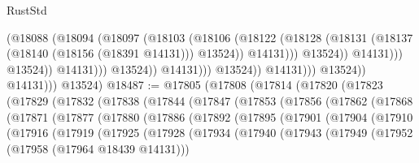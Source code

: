 \begin{lexlean}{RustStd}
\begin{coremodule}
                                                (@18088
                                                  (@18094
                                                    (@18097
                                                      (@18103
                                                        (@18106
                                                          (@18122
                                                            (@18128
                                                              (@18131
                                                                (@18137
                                                                  (@18140 (@18156 (@18391 @14131)))
                                                                  @13524))
                                                              @14131)))
                                                        @13524))
                                                    @14131)))
                                              @13524))
                                          @14131)))
                                    @13524))
                                @14131)))
                          @13524))
                      @14131)))
                @13524))
            @14131)))
      @13524)
@18487 := @17805
    (@17808
      (@17814
        (@17820
          (@17823
            (@17829
              (@17832
                (@17838
                  (@17844
                    (@17847
                      (@17853
                        (@17856
                          (@17862
                            (@17868
                              (@17871
                                (@17877
                                  (@17880
                                    (@17886
                                      (@17892
                                        (@17895
                                          (@17901
                                            (@17904
                                              (@17910
                                                (@17916
                                                  (@17919
                                                    (@17925
                                                      (@17928
                                                        (@17934
                                                          (@17940
                                                            (@17943
                                                              (@17949
                                                                (@17952
                                                                  (@17958 (@17964 @18439 @14131)))

\end{coremodule}
\end{lexlean}
